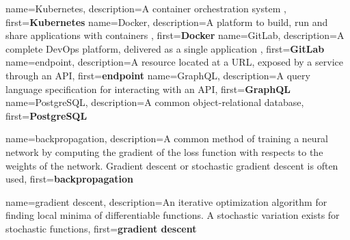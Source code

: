 {
    name=Kubernetes,
    description={A container orchestration system \cite{Kubernetes}},
    first={\textbf{Kubernetes}}
}
{
    name=Docker,
    description={A platform to build, run and share applications with containers \cite{Docker}},
    first={\textbf{Docker}}
}
{
    name=GitLab,
    description={A complete DevOps platform, delivered as a single application \cite{gitlab_what}},
    first={\textbf{GitLab}}
}
{
    name=endpoint,
    description={A resource located at a URL, exposed by a service through an API},
    first={\textbf{endpoint}}
}
{
    name=GraphQL,
    description={A query language specification for interacting with an API},
    first={\textbf{GraphQL}}    
}
{
    name=PostgreSQL,
    description={A common object-relational database},
    first={\textbf{PostgreSQL}}
}

{
    name=backpropagation,
    description={A common method of training a neural network by computing the gradient of the loss function with respects to the weights of the network. Gradient descent or stochastic gradient descent is often used},
    first={\textbf{backpropagation}}
}

{
    name=gradient descent,
    description={An iterative optimization algorithm for finding local minima of differentiable functions. A stochastic variation exists for stochastic functions},
    first={\textbf{gradient descent}}
}

